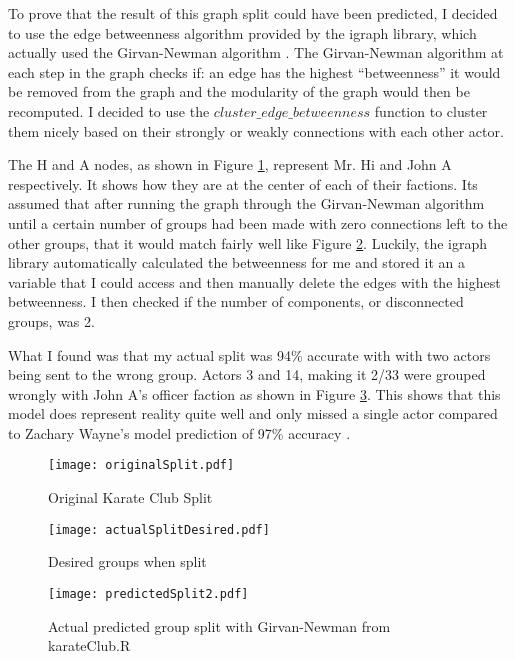 \documentclass[letterpaper,11pt]{article}
\newcommand*{\srcPath}{../src}%
\begin{document}
To prove that the result of this graph split could have been predicted, I decided to use the edge betweenness algorithm provided by the igraph library, which actually used the Girvan-Newman algorithm \cite{commref}. The Girvan-Newman algorithm at each step in the graph checks if: an edge has the highest ``betweenness'' it would be removed from the graph and the modularity of the graph would then be recomputed. I decided to use the $cluster\_edge\_betweenness$ function to cluster them nicely based on their strongly or weakly connections with each other actor.

The H and A nodes, as shown in Figure \ref{fig:q1orig}, represent Mr. Hi and John A respectively. It shows how they are at the center of each of their factions. Its assumed that after running the graph through the Girvan-Newman algorithm until a certain number of groups had been made with zero connections left to the other groups, that it would match fairly well like Figure \ref{fig:q1desired}. Luckily, the igraph library automatically calculated the betweenness for me and stored it an a variable that I could access and then manually delete the edges with the highest betweenness. I then checked if the number of components, or disconnected groups, was 2. 

What I found was that my actual split was 94\% accurate with with two actors being sent to the wrong group. Actors 3 and 14, making it 2/33 were grouped wrongly with John A's officer faction as shown in Figure \ref{fig:q1outcome}. This shows that this model does represent reality quite well and only missed a single actor compared to Zachary Wayne's model prediction of 97\% accuracy \cite{zachref}.

\begin{figure}[h]
\centering
\texttt{[image: originalSplit.pdf]}
\caption{Original Karate Club Split}
\label{fig:q1orig}
\end{figure}

\begin{figure}[h]
\centering
\texttt{[image: actualSplitDesired.pdf]}
\caption{Desired groups when split}
\label{fig:q1desired}
\end{figure}



\begin{figure}[h]
\centering
\texttt{[image: predictedSplit2.pdf]}
\caption{Actual predicted group split with Girvan-Newman from karateClub.R}
\label{fig:q1outcome}
\end{figure}
\end{document}
